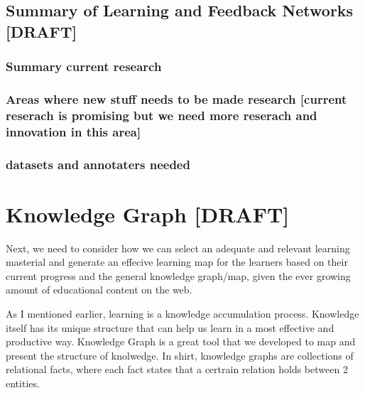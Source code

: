 \documentclass[]{book}
\theoremstyle{definition}
\theoremstyle{definition}
\theoremstyle{definition}
\theoremstyle{remark}
\begin{document}
\subsection{Summary of Learning and Feedback Networks
{[}DRAFT{]}}\label{summary-of-learning-and-feedback-networks-draft}

\subsubsection{Summary current research}\label{summary-current-research}

\subsubsection{Areas where new stuff needs to be made research
{[}current reserach is promising but we need more reserach and
innovation in this
area{]}}\label{areas-where-new-stuff-needs-to-be-made-research-current-reserach-is-promising-but-we-need-more-reserach-and-innovation-in-this-area}

\subsubsection{datasets and annotaters
needed}\label{datasets-and-annotaters-needed}

\section{Knowledge Graph {[}DRAFT{]}}\label{knowledge-graph-draft}

Next, we need to consider how we can select an adequate and relevant
learning masterial and generate an effecive learning map for the
learners based on their current progress and the general knowledge
graph/map, given the ever growing amount of educational content on the
web.

As I mentioned earlier, learning is a knowledge accumulation process.
Knowledge itself has its unique structure that can help us learn in a
most effective and productive way. Knowledge Graph is a great tool that
we developed to map and present the structure of knolwedge. In shirt,
knowledge graphs are collections of relational facts, where each fact
states that a certrain relation holds between 2 entities.
\end{document}
